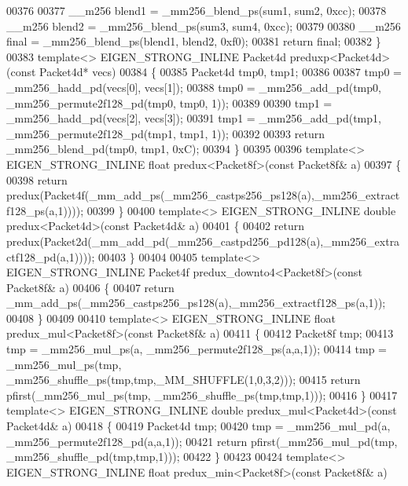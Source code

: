 \begin{DoxyCode}
{{00376 
00377     \_\_m256 blend1 = \_mm256\_blend\_ps(sum1, sum2, 0xcc);
00378     \_\_m256 blend2 = \_mm256\_blend\_ps(sum3, sum4, 0xcc);
00379 
00380     \_\_m256 \textcolor{keyword}{final} = \_mm256\_blend\_ps(blend1, blend2, 0xf0);
00381     \textcolor{keywordflow}{return} \textcolor{keyword}{final};
00382 \}
00383 \textcolor{keyword}{template}<> EIGEN\_STRONG\_INLINE Packet4d preduxp<Packet4d>(\textcolor{keyword}{const} Packet4d* vecs)
00384 \{
00385  Packet4d tmp0, tmp1;
00386 
00387   tmp0 = \_mm256\_hadd\_pd(vecs[0], vecs[1]);
00388   tmp0 = \_mm256\_add\_pd(tmp0, \_mm256\_permute2f128\_pd(tmp0, tmp0, 1));
00389 
00390   tmp1 = \_mm256\_hadd\_pd(vecs[2], vecs[3]);
00391   tmp1 = \_mm256\_add\_pd(tmp1, \_mm256\_permute2f128\_pd(tmp1, tmp1, 1));
00392 
00393   \textcolor{keywordflow}{return} \_mm256\_blend\_pd(tmp0, tmp1, 0xC);
00394 \}
00395 
00396 \textcolor{keyword}{template}<> EIGEN\_STRONG\_INLINE \textcolor{keywordtype}{float} predux<Packet8f>(\textcolor{keyword}{const} Packet8f& a)
00397 \{
00398   \textcolor{keywordflow}{return} predux(Packet4f(\_mm\_add\_ps(\_mm256\_castps256\_ps128(a),\_mm256\_extractf128\_ps(a,1))));
00399 \}
00400 \textcolor{keyword}{template}<> EIGEN\_STRONG\_INLINE \textcolor{keywordtype}{double} predux<Packet4d>(\textcolor{keyword}{const} Packet4d& a)
00401 \{
00402   \textcolor{keywordflow}{return} predux(Packet2d(\_mm\_add\_pd(\_mm256\_castpd256\_pd128(a),\_mm256\_extractf128\_pd(a,1))));
00403 \}
00404 
00405 \textcolor{keyword}{template}<> EIGEN\_STRONG\_INLINE Packet4f predux\_downto4<Packet8f>(\textcolor{keyword}{const} Packet8f& a)
00406 \{
00407   \textcolor{keywordflow}{return} \_mm\_add\_ps(\_mm256\_castps256\_ps128(a),\_mm256\_extractf128\_ps(a,1));
00408 \}
00409 
00410 \textcolor{keyword}{template}<> EIGEN\_STRONG\_INLINE \textcolor{keywordtype}{float} predux\_mul<Packet8f>(\textcolor{keyword}{const} Packet8f& a)
00411 \{
00412   Packet8f tmp;
00413   tmp = \_mm256\_mul\_ps(a, \_mm256\_permute2f128\_ps(a,a,1));
00414   tmp = \_mm256\_mul\_ps(tmp, \_mm256\_shuffle\_ps(tmp,tmp,\_MM\_SHUFFLE(1,0,3,2)));
00415   \textcolor{keywordflow}{return} pfirst(\_mm256\_mul\_ps(tmp, \_mm256\_shuffle\_ps(tmp,tmp,1)));
00416 \}
00417 \textcolor{keyword}{template}<> EIGEN\_STRONG\_INLINE \textcolor{keywordtype}{double} predux\_mul<Packet4d>(\textcolor{keyword}{const} Packet4d& a)
00418 \{
00419   Packet4d tmp;
00420   tmp = \_mm256\_mul\_pd(a, \_mm256\_permute2f128\_pd(a,a,1));
00421   \textcolor{keywordflow}{return} pfirst(\_mm256\_mul\_pd(tmp, \_mm256\_shuffle\_pd(tmp,tmp,1)));
00422 \}
00423 
00424 \textcolor{keyword}{template}<> EIGEN\_STRONG\_INLINE \textcolor{keywordtype}{float} predux\_min<Packet8f>(\textcolor{keyword}{const} Packet8f& a)
}}
\end{DoxyCode}
